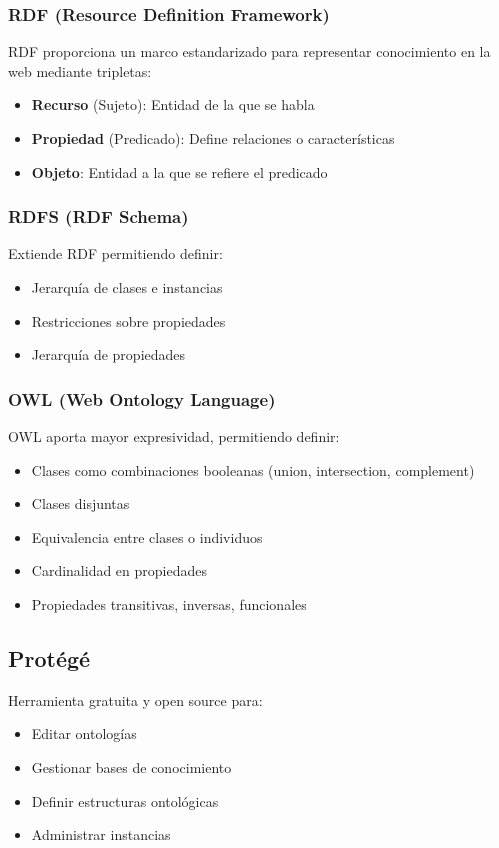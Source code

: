 \subsubsection{RDF (Resource Definition Framework)}
RDF proporciona un marco estandarizado para representar conocimiento en la web mediante tripletas:
\begin{itemize}
    \item \textbf{Recurso} (Sujeto): Entidad de la que se habla
    \item \textbf{Propiedad} (Predicado): Define relaciones o características
    \item \textbf{Objeto}: Entidad a la que se refiere el predicado
\end{itemize}

\subsubsection{RDFS (RDF Schema)}
Extiende RDF permitiendo definir:
\begin{itemize}
    \item Jerarquía de clases e instancias
    \item Restricciones sobre propiedades
    \item Jerarquía de propiedades
\end{itemize}

\subsubsection{OWL (Web Ontology Language)}
OWL aporta mayor expresividad, permitiendo definir:
\begin{itemize}
    \item Clases como combinaciones booleanas (union, intersection, complement)
    \item Clases disjuntas
    \item Equivalencia entre clases o individuos
    \item Cardinalidad en propiedades
    \item Propiedades transitivas, inversas, funcionales
\end{itemize}

\subsection{Protégé}
Herramienta gratuita y open source para:
\begin{itemize}
    \item Editar ontologías
    \item Gestionar bases de conocimiento
    \item Definir estructuras ontológicas
    \item Administrar instancias
\end{itemize}

